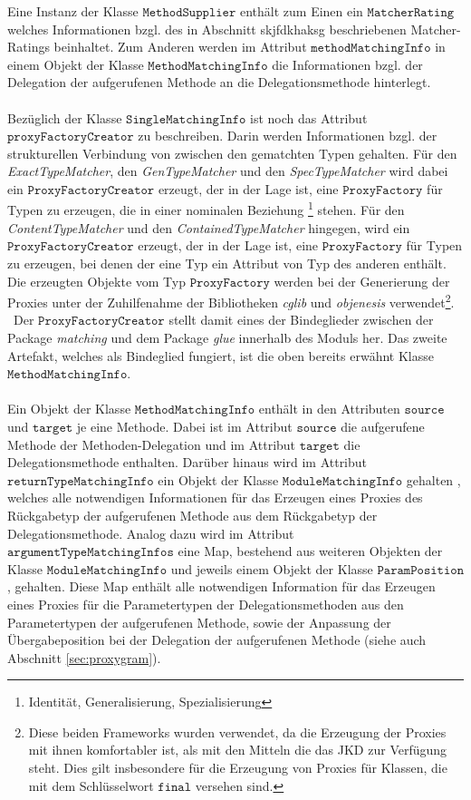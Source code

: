 {{Eine Instanz der Klasse $\texttt{MethodSupplier}$ enthält zum Einen ein $\texttt{MatcherRating}$ welches Informationen bzgl. des in Abschnitt skjfdkhaksg beschriebenen Matcher-Ratings beinhaltet. Zum Anderen werden im Attribut $\texttt{methodMatchingInfo}$ in einem Objekt der Klasse $\texttt{MethodMatchingInfo}$ die Informationen bzgl. der Delegation der aufgerufenen Methode an die Delegationsmethode hinterlegt. 
\\\\
Bezüglich der Klasse $\texttt{SingleMatchingInfo}$ ist noch das Attribut $\texttt{proxyFactoryCreator}$ zu beschreiben. Darin werden Informationen bzgl. der strukturellen Verbindung von zwischen den gematchten Typen gehalten. Für den \emph{ExactTypeMatcher}, den \emph{GenTypeMatcher} und den \emph{SpecTypeMatcher} wird dabei ein $\texttt{ProxyFactoryCreator}$ erzeugt, der in der Lage ist, eine $\texttt{ProxyFactory}$ für Typen zu erzeugen, die in einer nominalen Beziehung \footnote{Identität, Generalisierung, Spezialisierung} stehen. Für den \emph{ContentTypeMatcher} und den \emph{ContainedTypeMatcher} hingegen, wird ein $\texttt{ProxyFactoryCreator}$ erzeugt, der in der Lage ist, eine $\texttt{ProxyFactory}$ für Typen zu erzeugen, bei denen der eine Typ ein Attribut von Typ des anderen enthält. Die erzeugten Objekte vom Typ $\texttt{ProxyFactory}$ werden bei der Generierung der Proxies unter der Zuhilfenahme der Bibliotheken \emph{cglib} und \emph{objenesis} verwendet\footnote{Diese beiden Frameworks wurden verwendet, da die Erzeugung der Proxies mit ihnen komfortabler ist, als mit den Mitteln die das JKD zur Verfügung steht. Dies gilt insbesondere für die Erzeugung von Proxies für Klassen, die mit dem Schlüsselwort $\texttt{final}$ versehen sind.}.
\\\
Der $\texttt{ProxyFactoryCreator}$ stellt damit eines der Bindeglieder zwischen der Package \emph{matching} und dem Package \emph{glue} innerhalb des Moduls her. Das zweite Artefakt, welches als Bindeglied fungiert, ist die oben bereits erwähnt Klasse $\texttt{MethodMatchingInfo}$.
\\\\
Ein Objekt der Klasse $\texttt{MethodMatchingInfo}$ enthält in den Attributen $\texttt{source}$ und $\texttt{target}$ je eine Methode. Dabei ist im Attribut $\texttt{source}$ die aufgerufene Methode der Methoden-Delegation und im Attribut $\texttt{target}$ die Delegationsmethode enthalten. Darüber hinaus wird im Attribut $\texttt{returnTypeMatchingInfo}$ ein Objekt der Klasse $\texttt{ModuleMatchingInfo}$ gehalten , welches alle notwendigen Informationen für das Erzeugen eines Proxies des Rückgabetyp der aufgerufenen Methode aus dem Rückgabetyp der Delegationsmethode. Analog dazu wird im Attribut $\texttt{argumentTypeMatchingInfos}$ eine Map, bestehend aus weiteren Objekten der Klasse $\texttt{ModuleMatchingInfo}$ und jeweils einem Objekt der Klasse $\texttt{ParamPosition}$, gehalten. Diese Map enthält alle notwendigen Information für das Erzeugen eines Proxies für die Parametertypen der Delegationsmethoden aus den Parametertypen der aufgerufenen Methode, sowie der Anpassung der Übergabeposition bei der Delegation der aufgerufenen Methode (siehe auch Abschnitt \ref{sec:proxygram}).
}}
